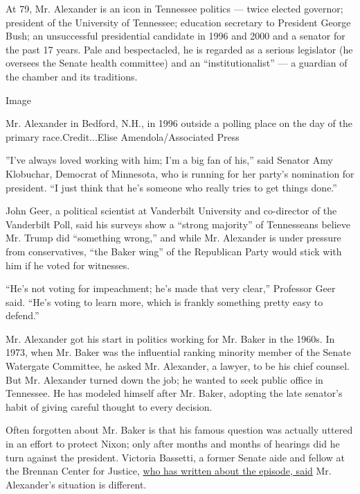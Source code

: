 At 79, Mr. Alexander is an icon in Tennessee politics --- twice elected
governor; president of the University of Tennessee; education secretary
to President George Bush; an unsuccessful presidential candidate in 1996
and 2000 and a senator for the past 17 years. Pale and bespectacled, he
is regarded as a serious legislator (he oversees the Senate health
committee) and an ``institutionalist'' --- a guardian of the chamber and
its traditions.

Image

Mr. Alexander in Bedford, N.H., in 1996 outside a polling place on the
day of the primary race.Credit...Elise Amendola/Associated Press

''I've always loved working with him; I'm a big fan of his,'' said
Senator Amy Klobuchar, Democrat of Minnesota, who is running for her
party's nomination for president. ``I just think that he's someone who
really tries to get things done.''

John Geer, a political scientist at Vanderbilt University and
co-director of the Vanderbilt Poll, said his surveys show a ``strong
majority'' of Tennesseans believe Mr. Trump did ``something wrong,'' and
while Mr. Alexander is under pressure from conservatives, ``the Baker
wing'' of the Republican Party would stick with him if he voted for
witnesses.

``He's not voting for impeachment; he's made that very clear,''
Professor Geer said. ``He's voting to learn more, which is frankly
something pretty easy to defend.''

Mr. Alexander got his start in politics working for Mr. Baker in the
1960s. In 1973, when Mr. Baker was the influential ranking minority
member of the Senate Watergate Committee, he asked Mr. Alexander, a
lawyer, to be his chief counsel. But Mr. Alexander turned down the job;
he wanted to seek public office in Tennessee. He has modeled himself
after Mr. Baker, adopting the late senator's habit of giving careful
thought to every decision.

Often forgotten about Mr. Baker is that his famous question was actually
uttered in an effort to protect Nixon; only after months and months of
hearings did he turn against the president. Victoria Bassetti, a former
Senate aide and fellow at the Brennan Center for Justice,
\href{https://www.brennancenter.org/our-work/analysis-opinion/curious-history-what-did-president-know-and-when-did-he-know-it}{who
has written about the episode, said} Mr. Alexander's situation is
different.

